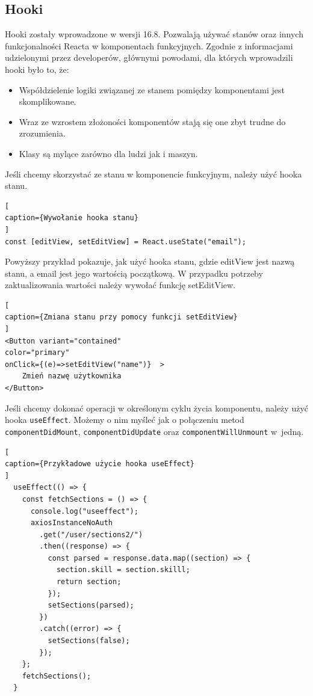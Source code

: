 \documentclass[oneside,polski,logo,indent]{amuthesis}
\begin{document}
\subsection{Hooki}
Hooki zostały wprowadzone w wersji 16.8. Pozwalają używać stanów oraz innych funkcjonalności Reacta w komponentach funkcyjnych.
\newline
Zgodnie z informacjami udzielonymi przez developerów, głównymi powodami, dla których wprowadzili hooki było to, że:
\begin{itemize}
\item Współdzielenie logiki związanej ze stanem pomiędzy komponentami jest skomplikowane.
\item Wraz ze wzrostem złożoności komponentów stają się one zbyt trudne do zrozumienia.
\item Klasy są mylące zarówno dla ludzi jak i maszyn.
\end{itemize}
Jeśli chcemy skorzystać ze stanu w komponencie funkcyjnym, należy użyć hooka stanu.
\begin{lstlisting}[
caption={Wywołanie hooka stanu}
]
const [editView, setEditView] = React.useState("email");
\end{lstlisting}
Powyższy przykład pokazuje, jak użyć hooka stanu, gdzie editView jest nazwą stanu, a email jest jego wartością początkową. W przypadku potrzeby zaktualizowania wartości należy 
wywołać funkcję setEditView.
\begin{lstlisting}[
caption={Zmiana stanu przy pomocy funkcji setEditView}
]
<Button variant="contained" 
color="primary" 
onClick={(e)=>setEditView("name")}  >
	Zmień nazwę użytkownika
</Button>
\end{lstlisting}
Jeśli chcemy dokonać operacji w określonym cyklu życia komponentu, należy użyć hooka \texttt{useEffect}. Możemy o nim myśleć jak o połączeniu metod \texttt{componentDidMount}, \texttt{componentDidUpdate} oraz \texttt{componentWillUnmount} w~jedną.
\begin{lstlisting}[
caption={Przykładowe użycie hooka useEffect}
]
  useEffect(() => {
    const fetchSections = () => {
      console.log("useeffect");
      axiosInstanceNoAuth
        .get("/user/sections2/")
        .then((response) => {
          const parsed = response.data.map((section) => {
            section.skill = section.skilll;
            return section;
          });
          setSections(parsed);
        })
        .catch((error) => {
          setSections(false);
        });
    };
    fetchSections();
  }
\end{lstlisting}
\end{document}
